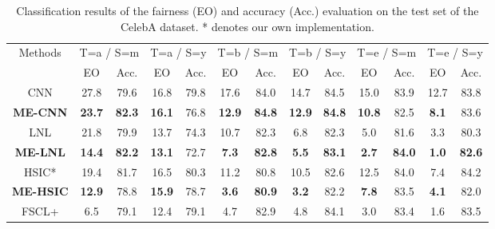 \begin{table}[ht]
\centering
\caption{Classification results of the fairness (EO) and accuracy (Acc.) evaluation on the test set of the CelebA dataset. * denotes our own implementation. }
\setlength{\tabcolsep}{4pt}
\label{Table:Compare_SOTA_CelebA}
\begin{tabular}{c||c|c||c|c||c|c||c|c||c|c||c|c}
\hline
\multirow{2}{*}{Methods}           & \multicolumn{2}{c||}{T=a / S=m} &\multicolumn{2}{c||}{T=a / S=y} &\multicolumn{2}{c||}{T=b / S=m}& \multicolumn{2}{c||}{T=b / S=y}& \multicolumn{2}{c||}{T=e / S=m} & \multicolumn{2}{c}{T=e / S=y}  \\ \cline{2-13}
                  & EO            & Acc.          & EO            & Acc.           & EO           & Acc.          & EO           & Acc.          & EO           & Acc.          & EO           & Acc.          \\ \hline \hline
CNN                   & 27.8          & 79.6          & 16.8          & 79.8           & 17.6         & 84.0          & 14.7         & 84.5          & 15.0         & 83.9          & 12.7         & 83.8          \\ 
\textbf{ME-CNN}       & \textbf{23.7} & \textbf{82.3} & \textbf{16.1} & 76.8           & \textbf{12.9} & \textbf{84.8}         & \textbf{12.9} & \textbf{84.8}         & \textbf{10.8} & 82.5          & \textbf{8.1} & 83.6          \\ \hline
LNL                   & 21.8          & 79.9          & 13.7          & 74.3           & 10.7         & 82.3          & 6.8          & 82.3          & 5.0          & 81.6          & 3.3          & 80.3          \\ 
\textbf{ME-LNL}       & \textbf{14.4} & \textbf{82.2} & \textbf{13.1} & 72.7           & \textbf{7.3} & \textbf{82.8} & \textbf{5.5} & \textbf{83.1} & \textbf{2.7} & \textbf{84.0} & \textbf{1.0} & \textbf{82.6} \\ \hline
HSIC*                 & 19.4          & 81.7          & 16.5          & 80.3           & 11.2         & 80.8          & 10.5         & 82.6          & 12.5         & 84.0          & 7.4          & 84.2          \\ 
\textbf{ME-HSIC}      & \textbf{12.9} & 78.8          & \textbf{15.9} & 78.7           & \textbf{3.6} & \textbf{80.9} & \textbf{3.2} & 82.2          & \textbf{7.8} & 83.5          & \textbf{4.1} & 82.0          \\ \hline
FSCL+                 & 6.5           & 79.1          & 12.4          & 79.1           & 4.7          & 82.9          & 4.8          & 84.1          & 3.0          & 83.4          & 1.6          & 83.5          \\ 

\end{tabular}
\end{table}
